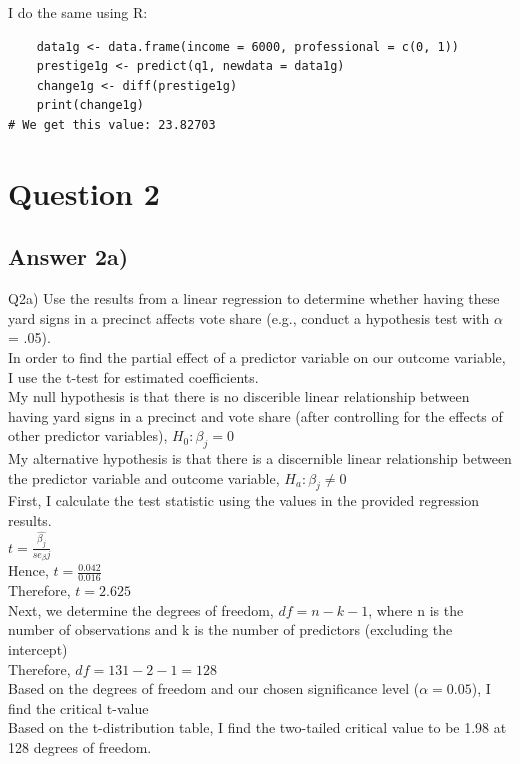 \documentclass{article}
\begin{document}
I do the same using R:
\begin{verbatim}
    data1g <- data.frame(income = 6000, professional = c(0, 1))
    prestige1g <- predict(q1, newdata = data1g)
    change1g <- diff(prestige1g)
    print(change1g)
# We get this value: 23.82703 
\end{verbatim}

\pagebreak

\section{Question 2}

\subsection{Answer 2a)}
Q2a) Use the results from a linear regression to determine whether having these yard signs in a precinct affects vote share (e.g., conduct a hypothesis test with $\alpha$ = .05).
\\
\noindent In order to find the partial effect of a predictor variable on our outcome variable, I use the t-test for estimated coefficients.
\\
\noindent My null hypothesis is that there is no discerible linear relationship between having yard signs in a precinct and vote share (after controlling for the effects of other predictor variables), $H_0: \beta_j = 0$ 
\\
\noindent My alternative hypothesis is that there is a discernible linear relationship between the predictor variable and outcome variable, $H_a: 
\beta_j \neq 0 $
\\
First, I calculate the test statistic using the values in the provided regression results.
\\
$t = \frac{\hat{\beta_j}}{se_\beta j}$
\\
Hence, $t = \frac{0.042}{0.016}$
\\
Therefore, $t = 2.625$
\\
Next, we determine the degrees of freedom,
$df = n - k - 1$,
where n is the number of observations
and k is the number of predictors (excluding the intercept)
\\
Therefore, $df = 131 - 2 - 1 = 128$
\\
Based on the degrees of freedom and our chosen significance level ($\alpha=0.05$), I find the critical t-value
\\
Based on the t-distribution table, I find the two-tailed critical value to 
be 1.98 at 128 degrees of freedom. 
\end{document}
